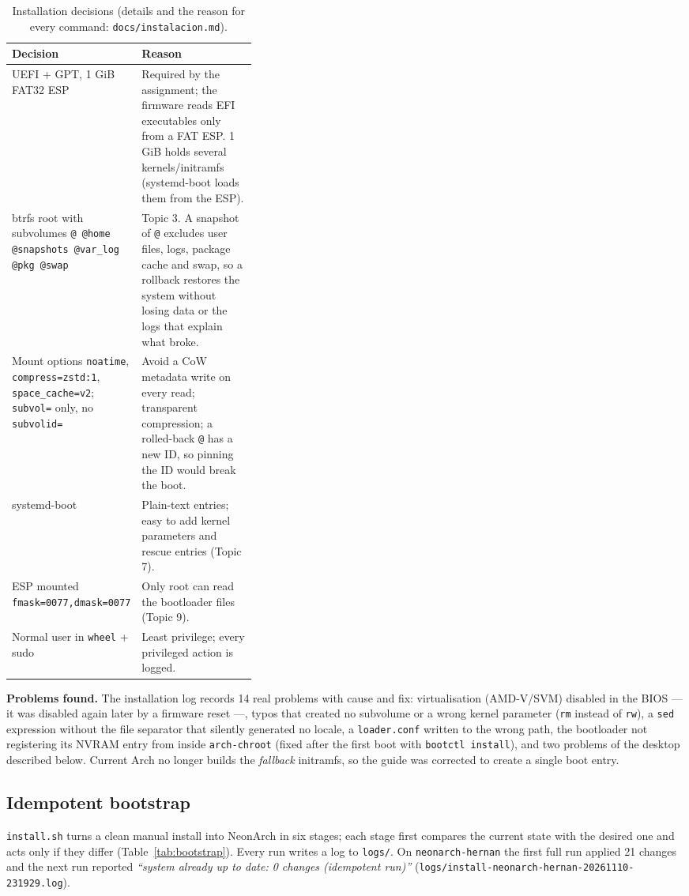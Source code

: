 \documentclass[10.5pt,a4paper]{article}
\newcommand{\cmd}[1]{\texttt{#1}}
\begin{document}
\begin{table}[H]
\centering\small
\begin{tabularx}{\linewidth}{@{}>{\raggedright\arraybackslash}p{0.36\linewidth}L@{}}
\toprule
Decision & Reason\\ \midrule
UEFI + GPT, 1 GiB FAT32 ESP & Required by the assignment; the firmware reads EFI executables only from a FAT ESP. 1 GiB holds several kernels/initramfs (systemd-boot loads them from the ESP).\\
btrfs root with subvolumes \cmd{@ @home @snapshots @var\_log @pkg @swap} & Topic 3. A snapshot of \cmd{@} excludes user files, logs, package cache and swap, so a rollback restores the system without losing data or the logs that explain what broke.\\
Mount options \cmd{noatime}, \cmd{compress=zstd:1}, \cmd{space\_cache=v2}; \cmd{subvol=} only, no \cmd{subvolid=} & Avoid a CoW metadata write on every read; transparent compression; a rolled-back \cmd{@} has a new ID, so pinning the ID would break the boot.\\
systemd-boot & Plain-text entries; easy to add kernel parameters and rescue entries (Topic 7).\\
ESP mounted \cmd{fmask=0077,dmask=0077} & Only root can read the bootloader files (Topic 9).\\
Normal user in \cmd{wheel} + sudo & Least privilege; every privileged action is logged.\\
\bottomrule
\end{tabularx}
\caption{Installation decisions (details and the reason for every command: \cmd{docs/instalacion.md}).}
\label{tab:install}
\end{table}

\textbf{Problems found.} The installation log records 14 real problems with cause and fix: virtualisation (AMD-V/SVM) disabled in the BIOS — it was disabled again later by a firmware reset —, typos that created no subvolume or a wrong kernel parameter (\cmd{rm} instead of \cmd{rw}), a \cmd{sed} expression without the file separator that silently generated no locale, a \cmd{loader.conf} written to the wrong path, the bootloader not registering its NVRAM entry from inside \cmd{arch-chroot} (fixed after the first boot with \cmd{bootctl install}), and two problems of the desktop described below. Current Arch no longer builds the \emph{fallback} initramfs, so the guide was corrected to create a single boot entry.

\subsection{Idempotent bootstrap}
\cmd{install.sh} turns a clean manual install into NeonArch in six stages; each stage first compares the current state with the desired one and acts only if they differ (Table~\ref{tab:bootstrap}). Every run writes a log to \cmd{logs/}. On \cmd{neonarch-hernan} the first full run applied 21 changes and the next run reported \emph{``system already up to date: 0 changes (idempotent run)''} (\cmd{logs/install-neonarch-hernan-20261110-231929.log}).
\end{document}
